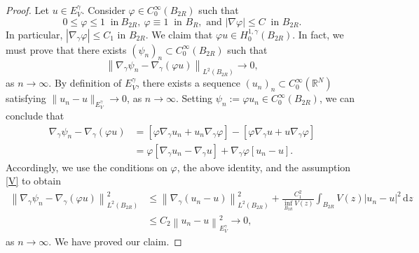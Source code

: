 \documentclass[12pt]{amsart}
\begin{document}
\begin{proof}
Let $u \in E_V^\gamma$. Consider $\varphi \in C_0^{\infty}\left(B_{2R}\right)$ such that 
\begin{equation}\label{def-varphi}
    0 \leqslant \varphi \leqslant 1 \ \mbox{ in}\  B_{2R}, \ \varphi \equiv 1 \ \mbox{ in  } B_{R},  \mbox{ and  } |\nabla \varphi| \leqslant C \ \mbox{ in  } B_{2R}.
\end{equation}
In particular, $|\nabla _\gamma \varphi| \leq C_1$ in $B_{2R}$. We claim that  $\varphi u \in H_0^{1, \gamma}\left(B_{2R}\right)$.  In fact, we must prove that there exists $\left(\psi_n\right)_n \subset C_0^{\infty}\left(B_{2R}\right)$ such that $$\left\|\nabla_\gamma \psi_n-\nabla_\gamma (\varphi u)\right\|_{L^2(B_{2R})} \rightarrow 0,$$
as $n\rightarrow\infty$. By definition of $E_V^\gamma$, there exists a sequence $(u_n)_n \subset C_0^{\infty}\left(\mathbb{R}^N\right)$ satisfying $\|u_n-u\|_{E_V^\gamma} \rightarrow 0$, as $n\rightarrow \infty$. Setting $\psi_n:=\varphi u_n \in C_0^\infty(B_{2R})$, we can conclude that
$$
\begin{aligned}
    \nabla_\gamma \psi_n
-\nabla_\gamma\left(\varphi  u\right) & = [\varphi \nabla_\gamma u_n + u_n \nabla_\gamma \varphi] - [\varphi \nabla_\gamma u + u \nabla_\gamma \varphi]
\\
& = \varphi\left[\nabla_\gamma u_n-\nabla_\gamma u\right]+\nabla_\gamma \varphi\left[u_n- u\right] .
\end{aligned}
$$
Accordingly, we use the conditions on $\varphi$, the above identity, and the assumption \ref{V} to obtain
\begin{align*}
\left\|\nabla_\gamma \psi_n-\nabla_\gamma\left(\varphi u\right)\right\|_{L^2(B_{2R})}^2 & \leq \left\|\nabla_\gamma\left(u_n-u\right)\right\|_{L^2(B_{2R})}^2 + \frac{C_1^2}{\inf_{B_{2R}} V(z)}\int_{B_{2R}} V(z)|u_n-u|^2\,\mathrm{d}z \\ & \leq C_2\left\|u_n-u\right\|_{E_V^\gamma}^2  \to 0 ,
\end{align*}
as $n\rightarrow\infty$. We have proved our claim.



\end{proof}
\end{document}
